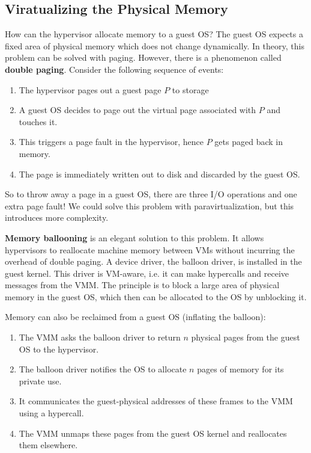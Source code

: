 \subsection{Viratualizing the Physical Memory}

How can the hypervisor allocate memory to a guest OS? The guest OS expects a fixed area of physical memory which does not change dynamically. In theory, this problem can be solved with paging. However, there is a phenomenon called \textbf{double paging}. Consider the following sequence of events:
\begin{enumerate}
	\item The hypervisor pages out a guest page $P$ to storage
	\item A guest OS decides to page out the virtual page associated with $P$ and touches it.
	\item This triggers a page fault in the hypervisor, hence $P$ gets paged back in memory.
	\item The page is immediately written out to disk and discarded by the guest OS.
\end{enumerate}
So to throw away a page in a guest OS, there are three I/O operations and one extra page fault! We could solve this problem with paravirtualization, but this introduces more complexity. \medskip

\textbf{Memory ballooning} is an elegant solution to this problem. It allows hypervisors to reallocate machine memory between VMs without incurring the overhead of double paging. A  device driver, the balloon driver, is installed in the guest kernel. This driver is VM-aware, i.e. it can make hypercalls and receive messages from the VMM. The principle is to block a large area of physical memory in the guest OS, which then can be allocated to the OS by unblocking it. \medskip

Memory can also be reclaimed from a guest OS (inflating the balloon):
\begin{enumerate}
	\item The VMM asks the balloon driver to return $n$ physical pages from the guest OS to the hypervisor.
	\item The balloon driver notifies the OS to allocate $n$ pages of memory for its private use.
	\item It communicates the guest-physical addresses of these frames to the VMM using a hypercall.
	\item The VMM unmaps these pages from the guest OS kernel and reallocates them elsewhere.
\end{enumerate}

